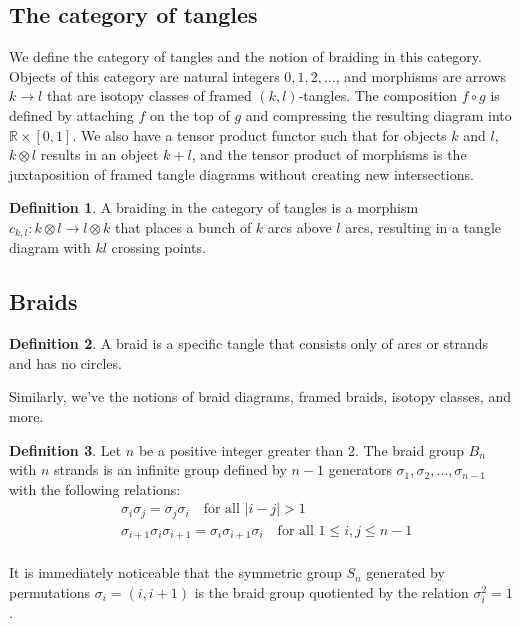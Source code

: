 \documentclass[11pt]{article}
\theoremstyle{definition}
\newtheorem{Def}{Definition}[section]
\begin{document}
\subsection{\Large \textbf{The category of tangles}}
We define the category of tangles and the notion of braiding in this category. Objects of this category are natural integers \(0,1,2,\ldots\), and morphisms are arrows \(k\to l\) that are isotopy classes of framed \((k,l)\)-tangles. The composition \(f\circ g\) is defined by attaching \(f\) on the top of \(g\) and compressing the resulting diagram into \(\mathbb{R}\times [0,1]\). We also have a tensor product functor such that for objects \(k\) and \(l\), \(k\otimes l\) results in an object \(k+l\), and the tensor product of morphisms is the juxtaposition of framed tangle diagrams without creating new intersections.


\begin{Def} A braiding in the category of tangles is a morphism \(c_{k,l}: k\otimes l \to l\otimes k\) that places a bunch of \(k\) arcs above \(l\) arcs, resulting in a tangle diagram with \(kl\) crossing points.
\end{Def}

\subsection{\Large \textbf{Braids}}
\begin{Def}
A braid is a specific tangle that consists only of arcs or strands and has no circles.
\end{Def}
Similarly, we've the notions of braid diagrams, framed braids, isotopy classes, and more.

\begin{Def}
Let \(n\) be a positive integer greater than 2. The braid group \(B_n\) with \(n\) strands is an infinite group defined by \(n-1\) generators \(\sigma_1, \sigma_2, \ldots, \sigma_{n-1}\) with the following relations:
\begin{align*}
&\sigma_i\sigma_j = \sigma_j\sigma_i \quad \text{for all } |i-j| > 1\\
&\sigma_{i+1}\sigma_i\sigma_{i+1} = \sigma_{i}\sigma_{i+1}\sigma_{i} \quad \text{for all } 1 \leq i, j \leq n-1 \\
\end{align*}
\end{Def}

It is immediately noticeable that the symmetric group \(S_n\) generated by permutations \(\sigma_i = (i,i+1)\) is the braid group quotiented by the relation \(\sigma_i^2 = 1\). 
\end{document}
